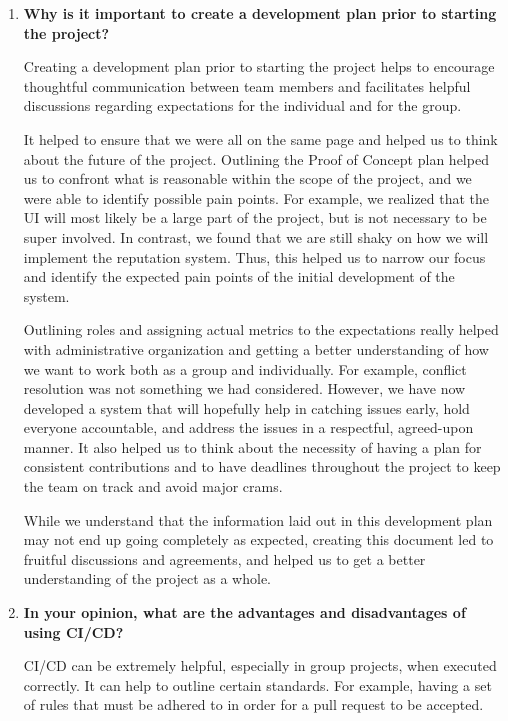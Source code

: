 \documentclass{article}
\begin{document}
\begin{enumerate}
    \item \textbf{Why is it important to create a development plan prior to starting the project?}

    \indent Creating a development plan prior to starting the project helps to encourage thoughtful communication between team members and facilitates helpful discussions regarding expectations for the individual and for the group.

    \indent It helped to ensure that we were all on the same page and helped us to think about the future of the project. Outlining the Proof of Concept plan helped us to confront what is reasonable within the scope of the project, and we were able to identify possible pain points. For example, we realized that the UI will most likely be a large part of the project, but is not necessary to be super involved. In contrast, we found that we are still shaky on how we will implement the reputation system. Thus, this helped us to narrow our focus and identify the expected pain points of the initial development of the system.

    \indent Outlining roles and assigning actual metrics to the expectations really helped with administrative organization and getting a better understanding of how we want to work both as a group and individually. For example, conflict resolution was not something we had considered. However, we have now developed a system that will hopefully help in catching issues early, hold everyone accountable, and address the issues in a respectful, agreed-upon manner. It also helped us to think about the necessity of having a plan for consistent contributions and to have deadlines throughout the project to keep the team on track and avoid major crams.

    \indent While we understand that the information laid out in this development plan may not end up going completely as expected, creating this document led to fruitful discussions and agreements, and helped us to get a better understanding of the project as a whole.

   
    \item \textbf{In your opinion, what are the advantages and disadvantages of using CI/CD?}

    \indent CI/CD can be extremely helpful, especially in group projects, when executed correctly. It can help to outline certain standards. For example, having a set of rules that must be adhered to in order for a pull request to be accepted.


\end{enumerate}
\end{document}
